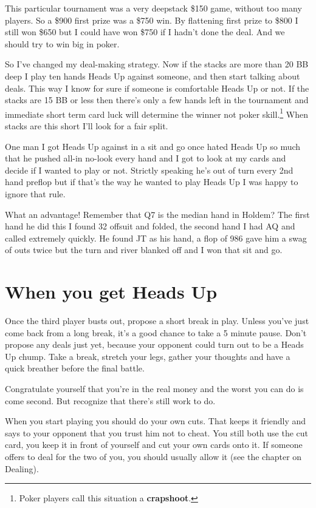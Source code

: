 This particular tournament was a very deepstack \$150
game, without too many players. So a \$900 first prize
was a \$750 win. By flattening first prize to \$800 I still won \$650 but
I could have won \$750 if I hadn't done the deal. And we should
try to win big in poker.

So I've changed my deal-making strategy. Now
if the stacks are more than 20 BB deep
I play ten hands Heads Up against someone,
and then start talking about deals. This way I know for sure if someone
is comfortable Heads Up or not. If the stacks are 15 BB or less then
there's only a few hands left in the tournament and immediate short term
card luck will determine the winner not poker skill.\footnote{Poker
players call this situation a \textbf{crapshoot}.} When stacks are
this short I'll look for a fair split.

One man I got Heads Up against in a sit and go once hated
Heads Up so much that he pushed all-in no-look every hand and
I got to look at my cards and decide if I wanted to play or not.
Strictly speaking he's out of turn every 2nd hand preflop but
if that's the way he wanted to play Heads Up I was happy to
ignore that rule.

What an advantage! Remember that Q7 is the median hand in Holdem?
The first hand he did this I found 32 offsuit
and folded, the second hand I had AQ and called extremely quickly.
He found JT as his hand, a flop of 986 gave him a swag of
outs twice but the turn and river blanked off and
I won that sit and go.

\section{When you get Heads Up}

Once the third player busts out, propose a short
break in play. Unless you've just come back from
a long break, it's a good chance to take a 5 minute
pause. Don't propose any deals just yet, because
your opponent could turn out to be a Heads Up chump.
Take a break, stretch your legs, gather your thoughts and have a quick
breather before the final battle.

Congratulate yourself that you're in the real money
and the worst you can do is come second. But
recognize that there's still work to do.

When you start playing you should do your own
cuts. That keeps it friendly and says to your
opponent that you trust him not to cheat. You
still both use the cut card, you keep it in
front of yourself and cut your own cards onto it.
If someone offers to deal for the two of you, you
should usually allow it (see the chapter on
Dealing).

